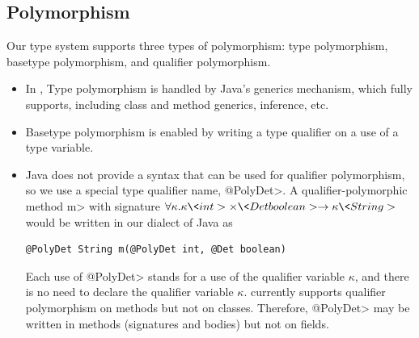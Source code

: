 \subsection{Polymorphism}\label{polymorphism}

Our type system supports three types of polymorphism:  type
polymorphism, basetype polymorphism, and qualifier polymorphism.
\begin{itemize}
\item
In \theDeterminismCheckerimplementation,
Type polymorphism is handled by Java's generics mechanism, which
\theDeterminismChecker fully supports, including class and method generics,
inference, etc.
\item
Basetype polymorphism is enabled by writing a type qualifier on a use of a
type variable.
\item
Java does not provide a syntax that can be used for qualifier polymorphism,
so we use a special type qualifier name, \<@PolyDet>.
A qualifier-polymorphic method \<m> with signature $\forall \kappa . \kappa \<int> \times \<Det boolean> \rightarrow
\kappa \<String>$ would be written in our dialect of Java as
\begin{Verbatim}
@PolyDet String m(@PolyDet int, @Det boolean)
\end{Verbatim}
Each use of \<@PolyDet> stands for a use of the qualifier variable
$\kappa$, and there is no need to declare the qualifier variable $\kappa$.
\TheDeterminismChecker currently supports
qualifier
polymorphism on methods but not on classes.
Therefore, \<@PolyDet> may be written in methods (signatures and bodies)
but not on fields.
\end{itemize}




